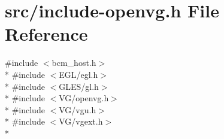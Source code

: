 \hypertarget{include-openvg_8h}{}\section{src/include-\/openvg.h File Reference}
\label{include-openvg_8h}
{\ttfamily \#include $<$bcm\+\_\+host.\+h$>$}\\*
{\ttfamily \#include $<$E\+G\+L/egl.\+h$>$}\\*
{\ttfamily \#include $<$G\+L\+E\+S/gl.\+h$>$}\\*
{\ttfamily \#include $<$V\+G/openvg.\+h$>$}\\*
{\ttfamily \#include $<$V\+G/vgu.\+h$>$}\\*
{\ttfamily \#include $<$V\+G/vgext.\+h$>$}\\*
